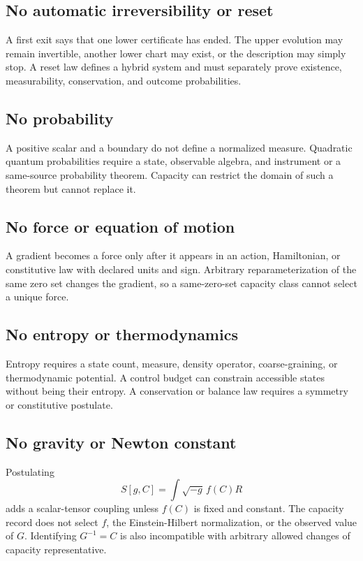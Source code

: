 \documentclass[11pt]{article}
\theoremstyle{definition}
\theoremstyle{remark}
\begin{document}
\subsection{No automatic irreversibility or reset}

A first exit says that one lower certificate has ended.  The upper evolution
may remain invertible, another lower chart may exist, or the description may
simply stop.  A reset law defines a hybrid system and must separately prove
existence, measurability, conservation, and outcome probabilities.

\subsection{No probability}

A positive scalar and a boundary do not define a normalized measure.
Quadratic quantum probabilities require a state, observable algebra, and
instrument or a same-source probability theorem.  Capacity can restrict the
domain of such a theorem but cannot replace it.

\subsection{No force or equation of motion}

A gradient becomes a force only after it appears in an action, Hamiltonian,
or constitutive law with declared units and sign.  Arbitrary
reparameterization of the same zero set changes the gradient, so a
same-zero-set capacity class cannot select a unique force.

\subsection{No entropy or thermodynamics}

Entropy requires a state count, measure, density operator, coarse-graining,
or thermodynamic potential.  A control budget can constrain accessible
states without being their entropy.  A conservation or balance law requires
a symmetry or constitutive postulate.

\subsection{No gravity or Newton constant}

Postulating
\[
 S[g,C]=\int\sqrt{-g}\,f(C)R
\]
adds a scalar-tensor coupling unless \(f(C)\) is fixed and constant.
The capacity record does not select \(f\), the Einstein-Hilbert
normalization, or the observed value of \(G\).  Identifying
\(G^{-1}=C\) is also incompatible with arbitrary allowed changes of
capacity representative.
\end{document}
